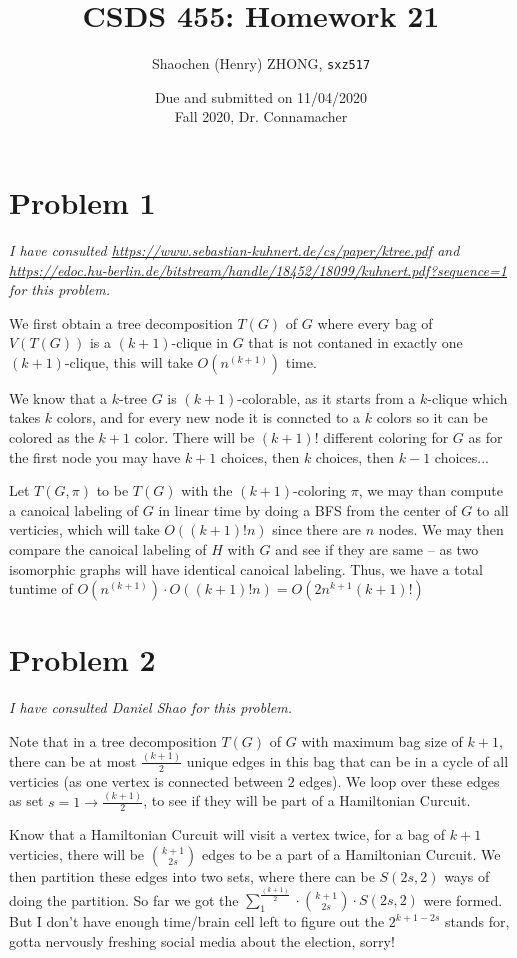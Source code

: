 \documentclass[11pt]{article}
\newcommand{\ilc}{\texttt}
\begin{document}
\title{\textbf{CSDS 455: Homework 21}}

\author{Shaochen (Henry) ZHONG, \ilc{sxz517}}
\date{Due and submitted on 11/04/2020 \\ Fall 2020, Dr. Connamacher}
\maketitle



\section*{Problem 1}

\textit{I have consulted \url{https://www.sebastian-kuhnert.de/cs/paper/ktree.pdf} and \url{https://edoc.hu-berlin.de/bitstream/handle/18452/18099/kuhnert.pdf?sequence=1} for this problem.}


We first obtain a tree decomposition $T(G)$ of $G$ where every bag of $V(T(G))$ is a $(k+1)$-clique in $G$ that is not contaned in exactly one $(k+1)$-clique, this will take $O(n^{(k+1)})$ time.

We know that a $k$-tree $G$ is $(k+1)$-colorable, as it starts from a $k$-clique which takes $k$ colors, and for every new node it is conncted to a $k$ colors so it can be colored as the $k+1$ color. There will be $(k+1)!$ different coloring for $G$ as for the first node you may have $k+1$ choices, then $k$ choices, then $k-1$ choices...


Let $T(G, \pi)$ to be $T(G)$ with the $(k+1)$-coloring $\pi$, we may than compute a canoical labeling of $G$ in linear time by doing a BFS from the center of $G$ to all verticies, which will take $O((k+1)!n)$ since there are $n$ nodes. We may then compare the canoical labeling of $H$ with $G$ and see if they are same -- as two isomorphic graphs will have identical canoical labeling. Thus, we have a total tuntime of $O(n^{(k+1)}) \cdot O((k+1)!n) = O(2n^{k+1}(k+1)!)$


\section*{Problem 2}

\textit{I have consulted Daniel Shao for this problem.}

Note that in a tree decomposition $T(G)$ of $G$ with maximum bag size of $k+1$, there can be at most $\frac{(k+1)}{2}$ unique edges in this bag that can be in a cycle of all verticies (as one vertex is connected between $2$ edges). We loop over these edges as set $s = 1 \to \frac{(k+1)}{2}$, to see if they will be part of a Hamiltonian Curcuit.

Know that a Hamiltonian Curcuit will visit a vertex twice, for a bag of $k+1$ verticies, there will be $k+1 \choose 2s$ edges to be a part of a Hamiltonian Curcuit. We then partition these edges into two sets, where there can be $S(2s, 2)$ ways of doing the partition. So far we got the $\sum^\frac{(k+1)}{2}_{1} \cdot { k+1 \choose 2s} \cdot S(2s, 2)$ were formed. But I don't have enough time/brain cell left to figure out the $2^{k+1-2s}$ stands for, gotta nervously freshing social media about the election, sorry!
\end{document}
